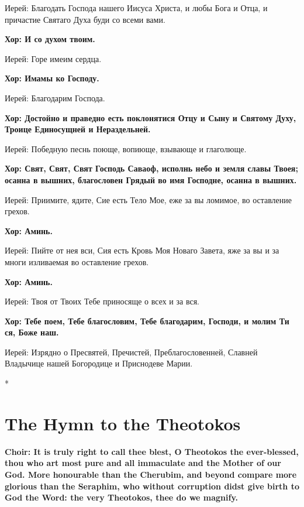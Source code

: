 \documentclass[12pt,a4paper,titlepage]{report}
\begin{document}
\begin{paracol}[1]{2}
	Иерей: Благодать Господа нашего Иисуса Христа, и любы Бога и Отца, и причастие Святаго Духа буди со всеми вами.
	
	\textbf{Хор: И со духом твоим.}
	
	Иерей: Горе имеим сердца.
	
	\textbf{Хор: Имамы ко Господу.}
	
	Иерей: Благодарим Господа.
	
	\textbf{Хор: Достойно и праведно есть поклонятися Отцу и Сыну и Святому Духу, Троице Единосущней и Нераздельней.}
	
	Иерей: Победную песнь поюще, вопиюще, взывающе и глаголюще.
	
	\textbf{Хор: Свят, Свят, Свят Господь Саваоф, исполнь небо и земля славы Твоея; осанна в вышних, благословен Грядый во имя Господне, осанна в вышних.}
	
	Иерей: Приимите, ядите, Сие есть Тело Мое, еже за вы ломимое, во оставление грехов.
	
	\textbf{Хор: Аминь.}
	
	Иерей: Пийте от нея вси, Сия есть Кровь Моя Новаго Завета, яже за вы и за многи изливаемая во оставление грехов.
	
	\textbf{Хор: Аминь.}
	
	Иерей: Твоя от Твоих Тебе приносяще о всех и за вся.
	
	\textbf{Хор: Тебе поем, Тебе благословим, Тебе благодарим, Господи, и молим Ти ся, Боже наш.}
	
	Иерей: Изрядно о Пресвятей, Пречистей, Преблагословенней, Славней Владычице нашей Богородице и Приснодеве Марии.
	
	\switchcolumn[0]*
	
	\section*{The Hymn to the Theotokos}
	
	\textbf{Choir: It is truly right to call thee blest, O Theotokos the ever-blessed, thou who art most pure and all immaculate and the Mother of our God. More honourable than the Cherubim, and beyond compare more glorious than the Seraphim, who without corruption didst give birth to God the Word: the very Theotokos, thee do we magnify.}
	

\end{paracol}
\end{document}
